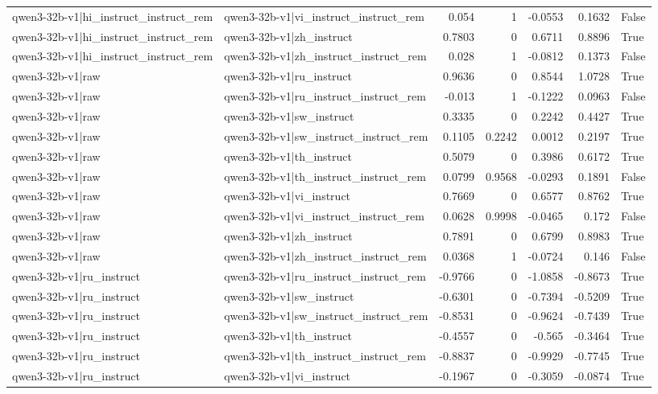 \begin{table}
\begin{tabular}{l l r r r r l}
qwen3-32b-v1|hi_instruct_instruct_rem & qwen3-32b-v1|vi_instruct_instruct_rem & 0.054 & 1 & -0.0553 & 0.1632 & False \\
qwen3-32b-v1|hi_instruct_instruct_rem & qwen3-32b-v1|zh_instruct & 0.7803 & 0 & 0.6711 & 0.8896 & True \\
qwen3-32b-v1|hi_instruct_instruct_rem & qwen3-32b-v1|zh_instruct_instruct_rem & 0.028 & 1 & -0.0812 & 0.1373 & False \\
qwen3-32b-v1|raw & qwen3-32b-v1|ru_instruct & 0.9636 & 0 & 0.8544 & 1.0728 & True \\
qwen3-32b-v1|raw & qwen3-32b-v1|ru_instruct_instruct_rem & -0.013 & 1 & -0.1222 & 0.0963 & False \\
qwen3-32b-v1|raw & qwen3-32b-v1|sw_instruct & 0.3335 & 0 & 0.2242 & 0.4427 & True \\
qwen3-32b-v1|raw & qwen3-32b-v1|sw_instruct_instruct_rem & 0.1105 & 0.2242 & 0.0012 & 0.2197 & True \\
qwen3-32b-v1|raw & qwen3-32b-v1|th_instruct & 0.5079 & 0 & 0.3986 & 0.6172 & True \\
qwen3-32b-v1|raw & qwen3-32b-v1|th_instruct_instruct_rem & 0.0799 & 0.9568 & -0.0293 & 0.1891 & False \\
qwen3-32b-v1|raw & qwen3-32b-v1|vi_instruct & 0.7669 & 0 & 0.6577 & 0.8762 & True \\
qwen3-32b-v1|raw & qwen3-32b-v1|vi_instruct_instruct_rem & 0.0628 & 0.9998 & -0.0465 & 0.172 & False \\
qwen3-32b-v1|raw & qwen3-32b-v1|zh_instruct & 0.7891 & 0 & 0.6799 & 0.8983 & True \\
qwen3-32b-v1|raw & qwen3-32b-v1|zh_instruct_instruct_rem & 0.0368 & 1 & -0.0724 & 0.146 & False \\
qwen3-32b-v1|ru_instruct & qwen3-32b-v1|ru_instruct_instruct_rem & -0.9766 & 0 & -1.0858 & -0.8673 & True \\
qwen3-32b-v1|ru_instruct & qwen3-32b-v1|sw_instruct & -0.6301 & 0 & -0.7394 & -0.5209 & True \\
qwen3-32b-v1|ru_instruct & qwen3-32b-v1|sw_instruct_instruct_rem & -0.8531 & 0 & -0.9624 & -0.7439 & True \\
qwen3-32b-v1|ru_instruct & qwen3-32b-v1|th_instruct & -0.4557 & 0 & -0.565 & -0.3464 & True \\
qwen3-32b-v1|ru_instruct & qwen3-32b-v1|th_instruct_instruct_rem & -0.8837 & 0 & -0.9929 & -0.7745 & True \\
qwen3-32b-v1|ru_instruct & qwen3-32b-v1|vi_instruct & -0.1967 & 0 & -0.3059 & -0.0874 & True \\

\end{tabular}
\end{table}
